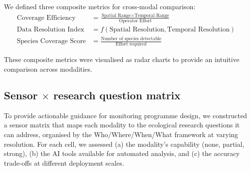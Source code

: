 \documentclass[12pt]{article}
\begin{document}
{We defined three composite metrics for cross-modal comparison:
\begin{align}
\text{Coverage Efficiency} &= \frac{\text{Spatial Range} \times \text{Temporal Range}}{\text{Operator Effort}} \label{eq:coverage} \\
\text{Data Resolution Index} &= f(\text{Spatial Resolution}, \text{Temporal Resolution}) \label{eq:resolution} \\
\text{Species Coverage Score} &= \frac{\text{Number of species detectable}}{\text{Effort required}} \label{eq:species_score}
\end{align}

These composite metrics were visualised as radar charts to provide an intuitive comparison across modalities.

\subsection{Sensor $\times$ research question matrix}
\label{sec:sensor_matrix}

To provide actionable guidance for monitoring programme design, we constructed a sensor matrix that maps each modality to the ecological research questions it can address, organised by the Who/Where/When/What framework at varying resolution. For each cell, we assessed (a) the modality's capability (none, partial, strong), (b) the AI tools available for automated analysis, and (c) the accuracy trade-offs at different deployment scales.

}
\end{document}
